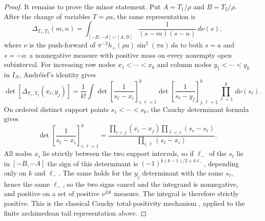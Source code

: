 \documentclass[11pt]{article}
\theoremstyle{plain}
\theoremstyle{definition}
\theoremstyle{remark}
\newcommand{\dd}{\,d}
\begin{document}
\begin{proof}
It remains to prove the minor statement.  Put $A=T_1/\rho$ and $B=T_2/\rho$.
After the change of variables $T=\rho a$, the same representation is
\[
 \Delta_{T_1,T_2}(m,n)
 =
 \int_{[-B,-A]\cup[A,B]}\frac{1}{(s-m)(s-n)}\dd\nu(s),
\]
where $\nu$ is the push-forward of
$\pi^{-2}h_+(\rho a)\sin^2(\pi a)\dd a$
to both $s=a$ and $s=-a$: a nonnegative measure with positive mass on every
nonempty open subinterval.  For increasing row nodes $x_1<\cdots<x_k$ and
column nodes $y_1<\cdots<y_k$ in $I_N$, Andr\'eief's identity
\cite{Andreief1886,Forrester2019} gives
\[
 \det[\Delta_{T_1,T_2}(x_i,y_j)]
 =
 \frac1{k!}\int
 \det\!\left[\frac1{s_\ell-x_i}\right]_{i,\ell=1}^k
 \det\!\left[\frac1{s_\ell-y_j}\right]_{j,\ell=1}^k
 \prod_{\ell=1}^k\dd\nu(s_\ell).
\]
On ordered distinct support points $s_1<\cdots<s_k$, the Cauchy determinant
formula \cite[Ch.~1]{Karlin1968} gives
\[
 \det\!\left[\frac1{s_\ell-x_i}\right]_{i,\ell=1}^k
 =
 \frac{\prod_{i<j}(x_i-x_j)\prod_{\ell<r}(s_r-s_\ell)}
      {\prod_{i,\ell}(s_\ell-x_i)} .
\]
All nodes $x_i$ lie strictly between the two support intervals, so if
$\ell_-$ of the $s_\ell$ lie in $[-B,-A]$ the sign of this determinant is
$(-1)^{k(k-1)/2+k\ell_-}$, depending only on $k$ and $\ell_-$.  The same
holds for the $y_j$ determinant with the same $s_\ell$, hence the same
$\ell_-$, so the two signs cancel and the integrand is nonnegative, and
positive on a set of positive $\nu^{\otimes k}$ measure.  The integral is
therefore strictly positive.  This is the classical Cauchy total-positivity
mechanism \cite{Karlin1968,Simon2014CauchyTP,BertolaGekhtmanSzmigielski2009},
applied to the finite archimedean tail representation above.
\end{proof}
\end{document}

